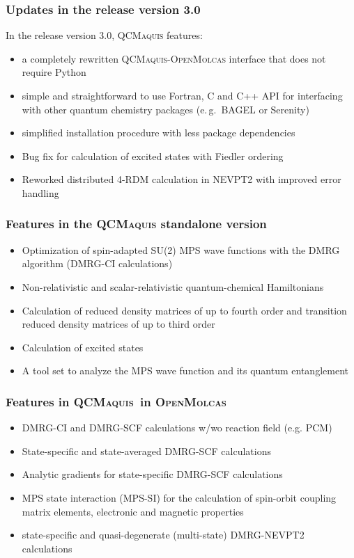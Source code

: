 \documentclass[bibliography=totoc,12pt,a4paper]{scrartcl}
\newcommand{\relv}{release version 3.0}
\newcommand{\mol}{\textsc{OpenMolcas}}
\newcommand{\qcm}{\textsc{QCMaquis}}
\begin{document}
\subsubsection{Updates in the \relv}
In the \relv, \qcm{} features:
\begin{itemize}
  \item a completely rewritten \qcm{}-\mol{} interface that does not require Python
  \item simple and straightforward to use Fortran, C and C++ API for interfacing with other quantum chemistry packages (e.\,g.\ BAGEL or Serenity)
  \item simplified installation procedure with less package dependencies
  \item Bug fix for calculation of excited states with Fiedler ordering
  \item Reworked distributed 4-RDM calculation in NEVPT2 with improved error handling
\end{itemize}

\subsubsection{Features in the \qcm{} standalone version}\label{sec:features-stand}

\begin{itemize}
	\item Optimization of spin-adapted SU(2) MPS wave functions with the DMRG algorithm (DMRG-CI calculations)
	\item Non-relativistic and scalar-relativistic quantum-chemical Hamiltonians
	\item Calculation of reduced density matrices of up to fourth order and transition reduced density matrices of up to third order
	\item Calculation of excited states
	\item A tool set to analyze the MPS wave function and its quantum entanglement
\end{itemize}

\subsubsection{Features in  \qcm\ in \mol}\label{sec:features-qcm-mol}

\begin{itemize}
	\item DMRG-CI and DMRG-SCF calculations w/wo reaction field (e.g. PCM)
	\item State-specific and state-averaged DMRG-SCF calculations
	\item Analytic gradients for state-specific DMRG-SCF calculations
  \item MPS state interaction (MPS-SI) for the calculation of spin-orbit coupling matrix elements,
  electronic and magnetic properties
  \item state-specific and quasi-degenerate (multi-state) DMRG-NEVPT2 calculations
\end{itemize}
\end{document}
